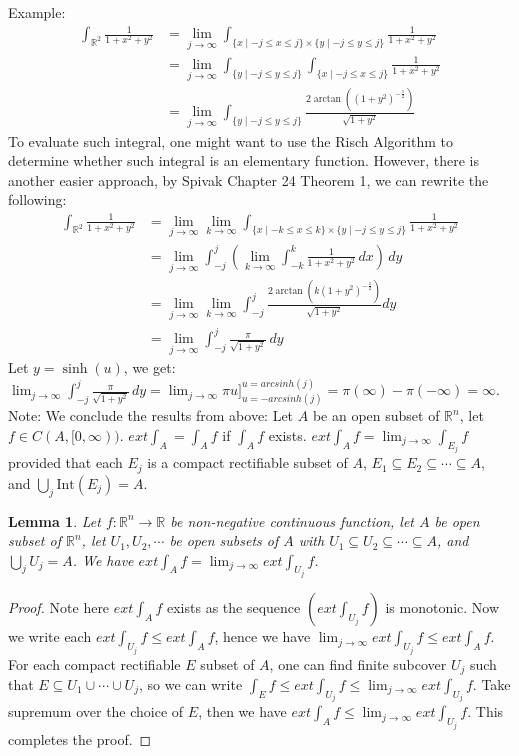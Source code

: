\documentclass[11pt,oneside]{book}
\theoremstyle{break}
\theoremstyle{break}
\newtheorem{lem}{Lemma}[thm]
\newcommand{\R}{\mathbb{R}}
\newcommand{\Int}{\text{Int}}
\newcommand{\note}{\color{red}Note: \color{black}}
\newcommand{\example}{\color{green}Example: \color{black}}
\begin{document}
\example 
\begin{align*}
\int_{\R^2} \frac{1}{1+x^2+y^2} &= \lim_{j\to \infty} \int_{\{x \mid -j \leq x\leq j\}\times \{y \mid  -j\leq y \leq j\}} \frac{1}{1+x^2+y^2} \\
&= \lim_{j\to \infty} \int_{\{y \mid -j\leq y \leq j\}} \int_{\{x \mid -j \leq x\leq j\}} \frac{1}{1+x^2+y^2} 
\\&= \lim_{j\to \infty} \int_{\{ y \mid -j \leq y \leq j\}} \frac{2\arctan\left((1+y^2)^{-\frac{1}{2}}\right)}{\sqrt{1+y^2}}
\end{align*}
To evaluate such integral, one might want to use the Risch Algorithm to determine whether such integral is an elementary function. However, there is another easier approach, by Spivak Chapter 24 Theorem 1, we can rewrite the following: 
\begin{align*}
\int_{\R^2} \frac{1}{1+x^2+y^2} &= \lim_{j \to \infty} \lim_{k \to \infty} \int_{\{x \mid -k\leq x \leq k \}\times\{y \mid -j \leq y \leq j\}} \frac{1}{1+x^2+y^2} \\&= \lim_{j \to \infty} \int_{-j}^j \left(\lim_{k \to \infty} \int_{-k}^k \frac{1}{1+x^2+y^2} \, dx\right)\, dy 
\\&= \lim_{j \to \infty} \lim_{k \to \infty} \int_{-j}^j \frac{2\arctan \left(k(1+y^2)^{-\frac{1}{2}}\right)}{\sqrt{1+y^2}} dy 
\\&= \lim_{j \to \infty} \int_{-j}^{j} \frac{\pi}{\sqrt{1+y^2}}\, dy
\end{align*}
Let $y = \sinh (u)$, we get: $\lim_{j \to \infty} \int_{-j}^{j} \frac{\pi}{\sqrt{1+y^2}}\, dy = \lim_{j\to \infty} \pi u ]_{u=-arcsinh (j)}^{u = arcsinh (j)} = \pi(\infty) - \pi(-\infty) = \infty$. \\

\note We conclude the results from above: Let $A $ be an open subset of $\R^n$, let $f \in C(A, [0,\infty))$. $ext \int_A  = \int_A f$ if $\int_A f$ exists. $ext \int_A f = \lim_{j\to \infty} \int_{E_j} f$ provided that each $E_j$ is a compact rectifiable subset of $A$, $E_1 \subseteq E_2 \subseteq \cdots \subseteq A$, and $\bigcup_{j} \Int(E_j) = A$. 

\begin{lem}
Let $f:\R^n \to \R$ be non-negative continuous function, let $A$ be open subset of $\R^n$, let $U_1,U_2,\cdots$ be open subsets of $A$ with $U_1 \subseteq U_2 \subseteq \cdots \subseteq A$, and $\bigcup_{j}{U_j} = A$. We have $ext\int_A f = \lim_{j\to \infty} ext\int_{U_j} f$.
\end{lem}
\begin{proof}
Note here $ext\int_A f$ exists as the sequence $(ext\int_{U_j} f)$ is monotonic. Now we write each $ext\int_{U_j} f \leq ext \int_A f$, hence we have $\lim_{j\to \infty} ext\int_{U_j} f \leq ext \int_A f$. For each compact rectifiable $E$ subset of $A$, one can find finite subcover $U_j$ such that $E \subseteq U_1 \cup \cdots \cup U_j$, so we can write $\int_E f \leq ext\int_{U_j} f \leq \lim_{j\to \infty} ext \int_{U_j} f$. Take supremum over the choice of $E$, then we have $ext \int_A f \leq  \lim_{j\to \infty} ext\int_{U_j} f$. This completes the proof. 
\end{proof}
\end{document}
